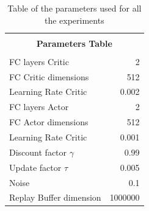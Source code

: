 \documentclass[a4paper]{report}
\begin{document}
\begin{table}[h]
\begin{center}
\begin{tabular}{|l|r|} 



\hline

\multicolumn{2}{|c|}{}\\
\multicolumn{2}{|c|}{\textbf{\Large            Parameters Table}}\\
\multicolumn{2}{|c|}{}\\

\hline

FC layers Critic 			& 2			\\
FC Critic dimensions		& 512		\\
Learning Rate Critic 		& 0.002		\\
FC layers Actor 			& 2			\\
FC Actor dimensions 		& 512		\\
Learning Rate Critic 		& 0.001		\\
Discount factor $\gamma$	& 0.99		\\
Update factor $\tau$		& 0.005		\\	%
Noise						& 0.1		\\
Replay Buffer dimension		& 1000000	\\

\hline
\end{tabular}
\end{center}
\caption{\label{table} Table of the parameters used for all the experiments}
\end{table}
\end{document}
